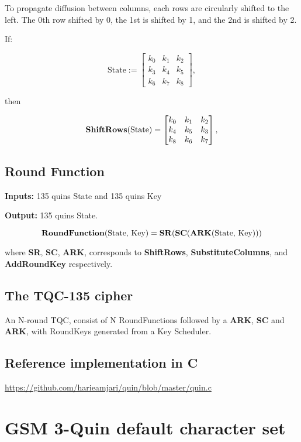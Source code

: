 \documentclass{article}
\begin{document}
\medskip

To propagate diffusion between columns, each rows are circularly
shifted to the left. The 0th row shifted by 0, the 1st is shifted by 1,
and the 2nd is shifted by 2.

If:

\[
\textrm{State} := 
\begin{bmatrix}
k_0 & k_1 & k_2 \\
k_3 & k_4 & k_5 \\
k_6 & k_7 & k_8
\end{bmatrix},
\]

then

\[
\textrm{\textbf{ShiftRows}(State)} =
\begin{bmatrix}
k_0 & k_1 & k_2 \\
k_4 & k_5 & k_3 \\
k_8 & k_6 & k_7
\end{bmatrix},
\]

\subsection{Round Function}

\textbf{Inputs:} 135 quins State and 135 quins Key

\noindent \textbf{Output:} 135 quins State.

\[
  \textrm{\textbf{RoundFunction}(State, Key)} = \textrm{\textbf{SR}(\textbf{SC}(\textbf{ARK}(State, Key)))}
\]

where \textbf{SR}, \textbf{SC}, \textbf{ARK}, corresponds to \textbf{ShiftRows}, \textbf{SubstituteColumns}, and \textbf{AddRoundKey} respectively.

\subsection{The TQC-135 cipher}

An N-round TQC, consist of N RoundFunctions followed by a \textbf{ARK}, \textbf{SC} and \textbf{ARK},
with RoundKeys generated from a Key Scheduler.

\subsection{Reference implementation in C}

\url{https://github.com/harieamjari/quin/blob/master/quin.c}

\appendix

\section{GSM 3-Quin default character set}
\end{document}
